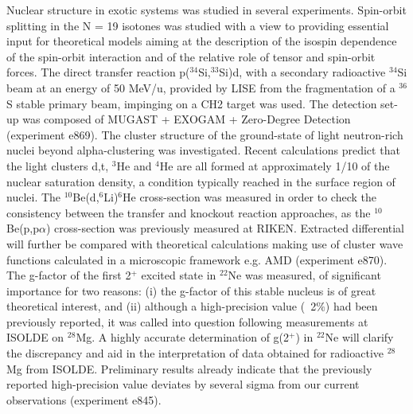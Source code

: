 Nuclear structure in exotic systems was studied in several experiments. Spin-orbit splitting in the N = 19 isotones was studied with a view to providing essential input for theoretical models aiming at the description of the isospin dependence of the spin-orbit interaction and of the relative role of tensor and spin-orbit forces. The direct transfer reaction p($^{34}$Si,$^{33}$Si)d, with a secondary radioactive $^{34}$Si beam at an energy of 50 MeV/u, provided by LISE from the fragmentation of a $^{36}$S stable primary beam, impinging on a CH2 target was used. The detection set-up was composed of MUGAST + EXOGAM + Zero-Degree Detection (experiment e869). The cluster structure of the ground-state of light neutron-rich nuclei beyond alpha-clustering was investigated. Recent calculations predict that the light clusters d,t, $^3$He and $^4$He are all formed at approximately 1/10 of the nuclear saturation density, a condition typically reached in the surface region of nuclei. The $^{10}$Be(d,$^6$Li)$^6$He cross-section was measured in order to check the consistency between the transfer and knockout reaction approaches, as the $^{10}$Be(p,p$\alpha$) cross-section was previously measured at RIKEN. Extracted differential will further be compared with theoretical calculations making use of cluster wave functions calculated in a microscopic framework e.g. AMD (experiment e870).  The g-factor of the first 2$^+$ excited state in $^{22}$Ne was measured, of significant importance for two reasons: (i) the g-factor of this stable nucleus is of great theoretical interest, and (ii) although a high-precision value (~2$\%$) had been previously reported, it was called into question following measurements at ISOLDE on $^{28}$Mg. A highly accurate determination of g(2$^+$) in $^{22}$Ne will clarify the discrepancy and aid in the interpretation of data obtained for radioactive $^{28}$Mg from ISOLDE. Preliminary results already indicate that the previously reported high-precision value deviates by several sigma from our current observations (experiment e845).

